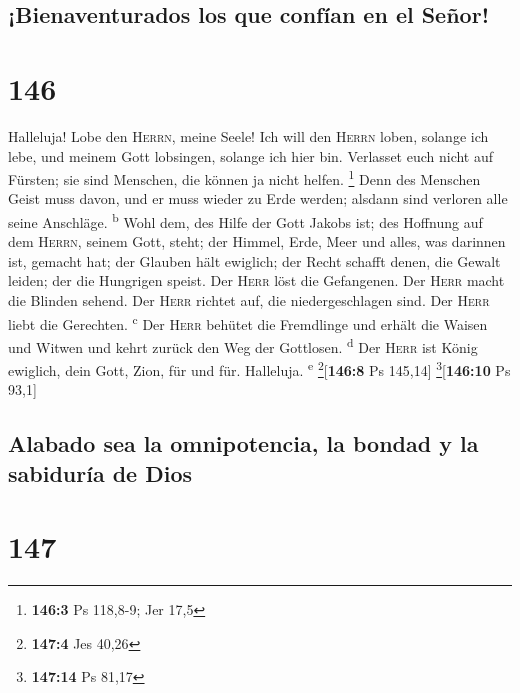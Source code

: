 \hypertarget{bienaventurados-los-que-confuxedan-en-el-seuxf1or}{%
\subsection{¡Bienaventurados los que confían en el
Señor!}\label{bienaventurados-los-que-confuxedan-en-el-seuxf1or}}

\hypertarget{section-145}{%
\section{146}\label{section-145}}

 Halleluja! Lobe den \textsc{Herrn}, meine Seele!
 Ich will den \textsc{Herrn} loben, solange ich lebe, und
meinem Gott lobsingen, solange ich hier bin.  Verlasset
euch nicht auf Fürsten; sie sind Menschen, die können ja nicht helfen.
\footnote{\textbf{146:3} Ps 118,8-9; Jer 17,5}  Denn des
Menschen Geist muss davon, und er muss wieder zu Erde werden; alsdann
sind verloren alle seine Anschläge. \textsuperscript{b} 
Wohl dem, des Hilfe der Gott Jakobs ist; des Hoffnung auf dem
\textsc{Herrn}, seinem Gott, steht;  der Himmel, Erde,
Meer und alles, was darinnen ist, gemacht hat; der Glauben hält
ewiglich;  der Recht schafft denen, die Gewalt leiden; der
die Hungrigen speist. Der \textsc{Herr} löst die Gefangenen.
 Der \textsc{Herr} macht die Blinden sehend. Der
\textsc{Herr} richtet auf, die niedergeschlagen sind. Der \textsc{Herr}
liebt die Gerechten. \textsuperscript{c}  Der
\textsc{Herr} behütet die Fremdlinge und erhält die Waisen und Witwen
und kehrt zurück den Weg der Gottlosen. \textsuperscript{d}
 Der \textsc{Herr} ist König ewiglich, dein Gott, Zion,
für und für. Halleluja. \textsuperscript{e} \footnote{\textbf{147:4} Jes
  40,26}{[}\textbf{146:8} Ps 145,14{]} \footnote{\textbf{147:14} Ps
  81,17}{[}\textbf{146:10} Ps 93,1{]}

\hypertarget{alabado-sea-la-omnipotencia-la-bondad-y-la-sabiduruxeda-de-dios}{%
\subsection{Alabado sea la omnipotencia, la bondad y la sabiduría de
Dios}\label{alabado-sea-la-omnipotencia-la-bondad-y-la-sabiduruxeda-de-dios}}

\hypertarget{section-146}{%
\section{147}\label{section-146}}

